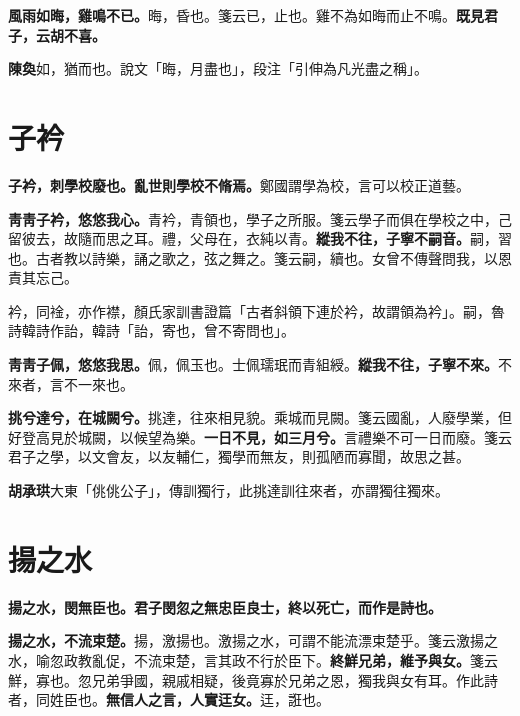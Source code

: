 \textbf{風雨如晦，雞鳴不已。}{\footnotesize 晦，昏也。箋云已，止也。雞不為如晦而止不鳴。}\textbf{既見君子，云胡不喜。}

\begin{quoting}\textbf{陳奐}如，猶而也。說文「晦，月盡也」，段注「引伸為凡光盡之稱」。\end{quoting}

\section{子衿}


\textbf{子衿，刺學校廢也。亂世則學校不脩焉。}{\footnotesize 鄭國謂學為校，言可以校正道藝。}

\textbf{靑靑子衿，悠悠我心。}{\footnotesize 青衿，青領也，學子之所服。箋云學子而俱在學校之中，己留彼去，故隨而思之耳。禮，父母在，衣純以青。}\textbf{縱我不往，子寧不嗣音。}{\footnotesize 嗣，習也。古者教以詩樂，誦之歌之，弦之舞之。箋云嗣，續也。女曾不傳聲問我，以恩責其忘己。}

\begin{quoting}衿，同䘳，亦作襟，顏氏家訓書證篇「古者斜領下連於衿，故謂領為衿」。嗣，魯詩韓詩作詒，韓詩「詒，寄也，曾不寄問也」。\end{quoting}

\textbf{靑靑子佩，悠悠我思。}{\footnotesize 佩，佩玉也。士佩瓀珉而青組綬。}\textbf{縱我不往，子寧不來。}{\footnotesize 不來者，言不一來也。}

\textbf{挑兮達兮，在城闕兮。}{\footnotesize 挑達，往來相見貌。乘城而見闕。箋云國亂，人廢學業，但好登高見於城闕，以候望為樂。}\textbf{一日不見，如三月兮。}{\footnotesize 言禮樂不可一日而廢。箋云君子之學，以文會友，以友輔仁，獨學而無友，則孤陋而寡聞，故思之甚。}

\begin{quoting}\textbf{胡承珙}大東「佻佻公子」，傳訓獨行，此挑達訓往來者，亦謂獨往獨來。\end{quoting}

\section{揚之水}


\textbf{揚之水，閔無臣也。君子閔忽之無忠臣良士，終以死亡，而作是詩也。}

\textbf{揚之水，不流束楚。}{\footnotesize 揚，激揚也。激揚之水，可謂不能流漂束楚乎。箋云激揚之水，喻忽政教亂促，不流束楚，言其政不行於臣下。}\textbf{終鮮兄弟，維予與女。}{\footnotesize 箋云鮮，寡也。忽兄弟爭國，親戚相疑，後竟寡於兄弟之恩，獨我與女有耳。作此詩者，同姓臣也。}\textbf{無信人之言，人實迋女。}{\footnotesize 迋，誑也。}

